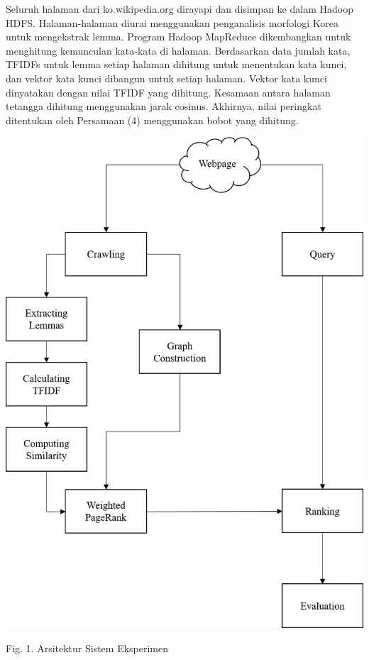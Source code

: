 \documentclass[conference]{IEEEtran}
\begin{document}
Seluruh halaman dari ko.wikipedia.org dirayapi dan disimpan ke dalam Hadoop HDFS.
Halaman-halaman diurai menggunakan penganalisis morfologi Korea untuk mengekstrak lemma. Program Hadoop MapReduce dikembangkan untuk menghitung kemunculan kata-kata di halaman. Berdasarkan data jumlah kata, TFIDFs untuk lemma setiap halaman dihitung untuk menentukan kata kunci, dan vektor kata kunci dibangun untuk setiap halaman.
Vektor kata kunci dinyatakan dengan nilai TFIDF yang dihitung. Kesamaan antara halaman tetangga dihitung menggunakan jarak cosinus. Akhirnya, nilai peringkat ditentukan oleh Persamaan (4) menggunakan bobot yang dihitung.
\begin{center}
    \includegraphics[scale=0.5]{Flowchart}

Fig. 1. Arsitektur Sistem Eksperimen
\end{center}
\end{document}
